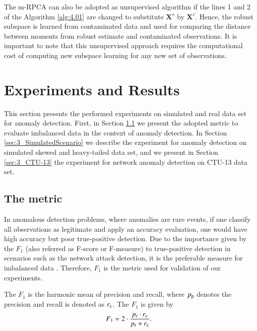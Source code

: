 \documentclass[review]{elsarticle}
\begin{document}
The m-RPCA can also be adopted as unsupervised algorithm if the lines 1 and 2 of the Algorithm \ref{alg:4.01} are changed to substitute $\pmb{X}^s$ by $\pmb{X}^c$. Hence, the robust subspace is learned from contaminated data and used for comparing the distance between moments from robust estimate and contaminated observations. It is important to note that this unsupervised approach requires the computational cost of computing new subspace learning for any new set of observations.


\section{Experiments and Results}
\label{sec:experimentalresults}


This section presents the performed experiments on simulated and real data set for anomaly detection. First, in Section \ref{sec:3_metric} we present the adopted metric to evaluate imbalanced data in the context of anomaly detection. In Section \ref{sec:3_SimulatedScenario} we describe the experiment for anomaly detection on simulated skewed and heavy-tailed data set, and we present in Section \ref{sec:3_CTU-13} the experiment for network anomaly detection on CTU-13 data set.

\subsection{The metric}
\label{sec:3_metric}

In anomalous detection problems, where anomalies are rare events, if one classify all observations as legitimate and apply an accuracy evaluation, one would have high accuracy but poor true-positive detection. Due to the importance given by the $F_1$ (also referred as F-score or F-measure) to true-positive detection in scenarios such as the network attack detection, it is the preferable measure for imbalanced data \cite{powers2011evaluation,moustafa2019holistic}. Therefore, $F_1$ is the metric used for validation of our experiments.

The $F_1$ is the harmonic mean of precision and recall, where $p_{\rm p}$ denotes the precision and recall is denoted as $r_{\rm c}$. The $F_1$ is given by
\begin{equation}\label{eq:4.15}
	F_1 = 2 \cdot \frac{p_{\rm r} \cdot r_{\rm c}}{p_{\rm r} + r_{\rm c}}.
\end{equation}
\end{document}
